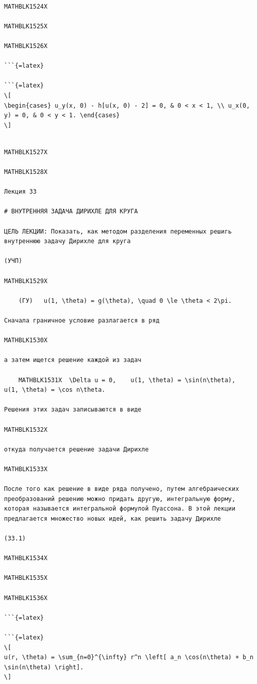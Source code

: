 \documentclass[
]{article}
\begin{document}
\begin{verbatim}

MATHBLK1524X

MATHBLK1525X

MATHBLK1526X

```{=latex}

```{=latex}
\[
\begin{cases} u_y(x, 0) - h[u(x, 0) - 2] = 0, & 0 < x < 1, \\ u_x(0, y) = 0, & 0 < y < 1. \end{cases}
\]
\end{verbatim}

\begin{verbatim}

MATHBLK1527X

MATHBLK1528X

Лекция 33

# ВНУТРЕННЯЯ ЗАДАЧА ДИРИХЛЕ ДЛЯ КРУГА

ЦЕЛЬ ЛЕКЦИИ: Показать, как методом разделения переменных решигь внутреннюю задачу Дирихле для круга

(УЧП)

MATHBLK1529X

    (ГУ)   u(1, \theta) = g(\theta), \quad 0 \le \theta < 2\pi. 

Сначала граничное условие разлагается в ряд

MATHBLK1530X

а затем ищется решение каждой из задач

    MATHBLK1531X  \Delta u = 0,    u(1, \theta) = \sin(n\theta),     u(1, \theta) = \cos n\theta.

Решения этих задач записываются в виде

MATHBLK1532X

откуда получается решение задачи Дирихле

MATHBLK1533X

После того как решение в виде ряда получено, путем алгебраических преобразований решению можно придать другую, интегральную форму, которая называется интегральной формулой Пуассона. В этой лекции предлагается множество новых идей, как решить задачу Дирихле

(33.1)

MATHBLK1534X

MATHBLK1535X

MATHBLK1536X

```{=latex}

```{=latex}
\[
u(r, \theta) = \sum_{n=0}^{\infty} r^n \left[ a_n \cos(n\theta) + b_n \sin(n\theta) \right].
\]
\end{verbatim}
\end{document}
